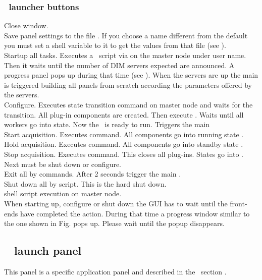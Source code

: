 {\subsubsection{\dabc\ launcher buttons}
 Close window.\\
 Save panel settings to the file .
If you choose a name different from the default you must
set a shell variable to it to get the values from that file
(see ).\\
 Startup all tasks. Executes a \dabc\ script  via  
on the master node under user name. Then it waits until the number of DIM servers
expected are announced. A progress panel pops up during that time
(see ).
When the servers are up the main  is triggered building
all panels from scratch according the parameters offered by the servers.\\
 Configure. Executes state transition command 
on master node and waits for the transition.
All plug-in components are created. Then execute .
Waits until all workers go into  state. Now the \dabc\ is ready to run.
Triggers the main \\
 Start acquisition. Executes  command.
All components go into running state .\\
 Hold acquisition. Executes  command.
All components go into standby state .\\
 Stop acquisition. Executes  command.
This closes all plug-ins. States go into . Next must be
shut down or configure.\\
 Exit all by  commands. After 2 seconds 
trigger the main .\\
 Shut down all by script. This is the hard shut down.\\
  shell script execution on master node.\\
When starting up, configure or shut down the GUI has to wait
until the front-ends have completed the action.
During that time a progress window similar to the one shown
in Fig.  pops up.
Please wait until the popup disappears.
\subsection{\mbs~ launch panel}
This panel is a specific application panel and described in the \mbs\ section .
}
